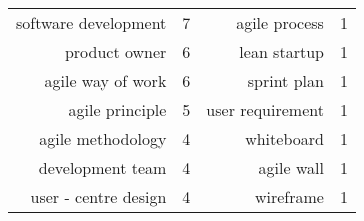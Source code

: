 \begin{spacing}{.65}
\begin{table}[!htbp]
{\begin{tabular}{rlrl}
software development                & 7              & agile process                  & 1              \\
product owner                       & 6              & lean startup                   & 1              \\
agile way of work                   & 6              & sprint plan                    & 1              \\
agile principle                     & 5              & user requirement               & 1              \\
agile methodology                   & 4              & whiteboard                     & 1              \\
development team                    & 4              & agile wall                     & 1              \\
user - centre design                & 4              & wireframe                      & 1              \\[0.5cm] 




\end{tabular}}
\end{table}
\end{spacing}
